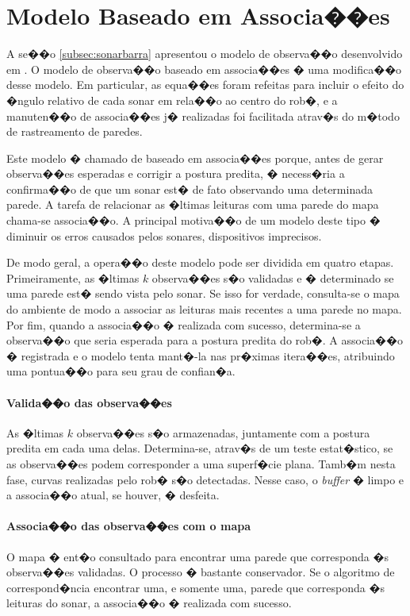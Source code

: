 \section{Modelo Baseado em Associa��es}
\label{sec:nossosonar}
A se��o \ref{subsec:sonarbarra} apresentou o modelo de observa��o desenvolvido em \cite{barra}. O modelo de observa��o baseado em associa��es � uma modifica��o desse modelo. Em particular, as equa��es foram refeitas para incluir o efeito do �ngulo relativo de cada sonar em rela��o ao centro do rob�, e a manuten��o de associa��es j� realizadas foi facilitada atrav�s do m�todo de rastreamento de paredes.

Este modelo � chamado de baseado em associa��es porque, antes de gerar observa��es esperadas e corrigir a postura predita, � necess�ria a confirma��o de que um sonar est� de fato observando uma determinada parede. A tarefa de relacionar as �ltimas leituras com uma parede do mapa chama-se associa��o. A principal motiva��o de um modelo deste tipo � diminuir os erros causados pelos sonares, dispositivos imprecisos.

De modo geral, a opera��o deste modelo pode ser dividida em quatro etapas. Primeiramente, as �ltimas $k$ observa��es s�o validadas e � determinado se uma parede est� sendo vista pelo sonar. Se isso for verdade, consulta-se o mapa do ambiente de modo a associar as leituras mais recentes a uma parede no mapa. Por fim, quando a associa��o � realizada com sucesso, determina-se a observa��o que seria esperada para a postura predita do rob�. A associa��o � registrada e o modelo tenta mant�-la nas pr�ximas itera��es, atribuindo uma pontua��o para seu grau de confian�a.

\paragraph{Valida��o das observa��es} As �ltimas $k$ observa��es s�o armazenadas, juntamente com a postura predita em cada uma delas. Determina-se, atrav�s de um teste estat�stico, se as observa��es podem corresponder a uma superf�cie plana. Tamb�m nesta fase, curvas realizadas pelo rob� s�o detectadas. Nesse caso, o \textit{buffer} � limpo e a associa��o atual, se houver, � desfeita.

\paragraph{Associa��o das observa��es com o mapa} O mapa � ent�o consultado para encontrar uma parede que corresponda �s observa��es validadas. O processo � bastante conservador. Se o algoritmo de correspond�ncia encontrar uma, e somente uma, parede que corresponda �s leituras do sonar, a associa��o � realizada com sucesso.

